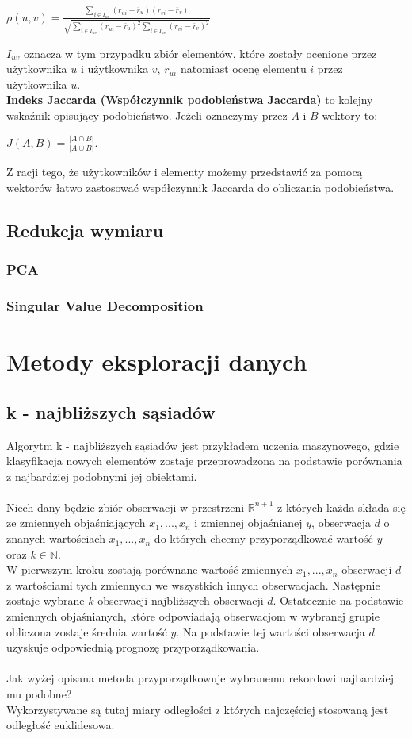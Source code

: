 \documentclass[12pt,a4paper]{report}
\begin{document}
\begin{center}
$\rho(u,v) = \frac{\sum_{i\in I_{uv}}(r_{ui}-\overline{r}_u)(r_{vi}-\overline{r}_v)}{\sqrt{\sum_{i\in I_{uv}}(r_{ui}-\overline{r}_u)^2 \sum_{i\in I_{uv}}(r_{vi}-\overline{r}_v)^2}}$
\end{center}
$I_{uv}$ oznacza w tym przypadku zbiór elementów, które zostały ocenione przez użytkownika $u$ i użytkownika $v$, $r_{ui}$ natomiast ocenę elementu $i$ przez użytkownika $u$.
\\\textbf{Indeks Jaccarda (Współczynnik podobieństwa Jaccarda)} to kolejny wskaźnik opisujący podobieństwo. Jeżeli oznaczymy przez $A$ i $B$ wektory to:
\begin{center}
$J(A,B)=\frac{|A\cap B|}{|A \cup B|}$.
\end{center}
Z racji tego, że użytkowników i elementy możemy przedstawić za pomocą wektorów łatwo zastosować współczynnik Jaccarda do obliczania podobieństwa.

\subsection{Redukcja wymiaru}
\subsubsection{PCA}
\subsubsection{Singular Value Decomposition}
\section{Metody eksploracji danych}
\subsection{k - najbliższych sąsiadów}%
Algorytm k - najbliższych sąsiadów jest przykładem uczenia maszynowego, gdzie klasyfikacja nowych elementów zostaje przeprowadzona na podstawie porównania z najbardziej podobnymi jej obiektami.
\\
\\Niech dany będzie zbiór obserwacji w przestrzeni $\mathbb{R}^{n+1}$ z których każda składa się ze zmiennych objaśniających $x_1, ...,x_n$ i zmiennej objaśnianej $y$, obserwacja $d$ o znanych wartościach $x_1, ...,x_n$ do których chcemy przyporządkować wartość $y$ oraz $k\in \mathbb{N}$.
\\W pierwszym kroku zostają porównane wartość zmiennych $x_1, ...,x_n$ obserwacji $d$ z wartościami tych zmiennych we wszystkich innych obserwacjach. Następnie zostaje wybrane $k$ obserwacji najbliższych obserwacji $d$. Ostatecznie na podstawie zmiennych objaśnianych, które odpowiadają obserwacjom w wybranej grupie obliczona zostaje średnia wartość $y$. Na podstawie tej wartości obserwacja $d$ uzyskuje odpowiednią prognozę przyporządkowania.
\\
\\Jak wyżej opisana metoda przyporządkowuje wybranemu rekordowi najbardziej mu podobne?
\\Wykorzystywane są tutaj miary odległości z których najczęściej stosowaną jest odległość euklidesowa.
\end{document}
